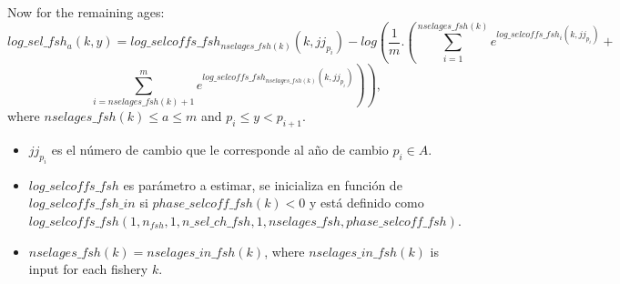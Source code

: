 \documentclass{article}
\begin{document}
\begin{itemize}
  Now for the remaining ages:
    \begin{equation}
         log\_sel\_fsh_a(k,y)=log\_selcoffs\_fsh_{nselages\_fsh(k)}(k,jj_{p_i})-log\left(\dfrac{1}{m}.\left(\sum_{i=1}^{nselages\_fsh(k)}e^{log\_selcoffs\_fsh_i(k,jj_{p_i})}+\right.\right.
    \end{equation}
 \begin{equation*}
       \left. \left.\sum_{i=nselages\_fsh(k)+1}^{m}e^{log\_selcoffs\_fsh_{nselages\_fsh(k)}(k,jj_{p_i})}\right)\right), 
    \end{equation*}
    where $nselages\_fsh(k)\leq a \leq m$ and $p_i\leq y < p_{i+1}$.
    \begin{itemize}
        \item $jj_{p_i}$ es el número de cambio que le corresponde al año de cambio $p_i\in A$.
        \item $log\_selcoffs\_fsh$ es parámetro a estimar, se inicializa en función de $log\_selcoffs\_fsh\_in$ si $phase\_selcoff\_fsh(k)<0$ y está definido como $log\_selcoffs\_fsh(1,n_{fsh},1,n\_sel\_ch\_fsh,1,nselages\_fsh,phase\_selcoff\_fsh)$.
        \item $nselages\_fsh(k)=nselages\_in\_fsh(k)$, where $nselages\_in\_fsh(k)$ is input for each fishery $k$.
    \end{itemize}














    
   

\end{itemize}
\end{document}
